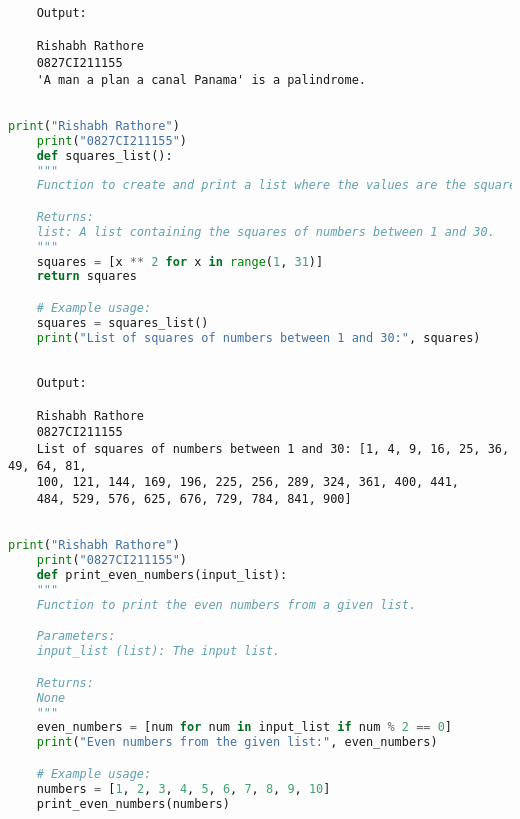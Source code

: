 \documentclass{report}
\begin{document}
\begin{verbatim}
	Output:

	Rishabh Rathore
	0827CI211155
	'A man a plan a canal Panama' is a palindrome.
	
\end{verbatim}


\newpage


\sol 
\begin{lstlisting}[language=Python]
	print("Rishabh Rathore")
	print("0827CI211155")
	def squares_list():
    """
    Function to create and print a list where the values are the squares of numbers between 1 and 30.

    Returns:
    list: A list containing the squares of numbers between 1 and 30.
    """
    squares = [x ** 2 for x in range(1, 31)]
    return squares

	# Example usage:
	squares = squares_list()
	print("List of squares of numbers between 1 and 30:", squares)
  

\end{lstlisting}

\begin{verbatim}
	Output:

	Rishabh Rathore
	0827CI211155
	List of squares of numbers between 1 and 30: [1, 4, 9, 16, 25, 36, 49, 64, 81,
	100, 121, 144, 169, 196, 225, 256, 289, 324, 361, 400, 441,
	484, 529, 576, 625, 676, 729, 784, 841, 900]
	

\end{verbatim}


\newpage


\sol 
\begin{lstlisting}[language=Python]
	print("Rishabh Rathore")
	print("0827CI211155")
	def print_even_numbers(input_list):
    """
    Function to print the even numbers from a given list.

    Parameters:
    input_list (list): The input list.

    Returns:
    None
    """
    even_numbers = [num for num in input_list if num % 2 == 0]
    print("Even numbers from the given list:", even_numbers)

	# Example usage:
	numbers = [1, 2, 3, 4, 5, 6, 7, 8, 9, 10]
	print_even_numbers(numbers)
  

\end{lstlisting}
\end{document}
